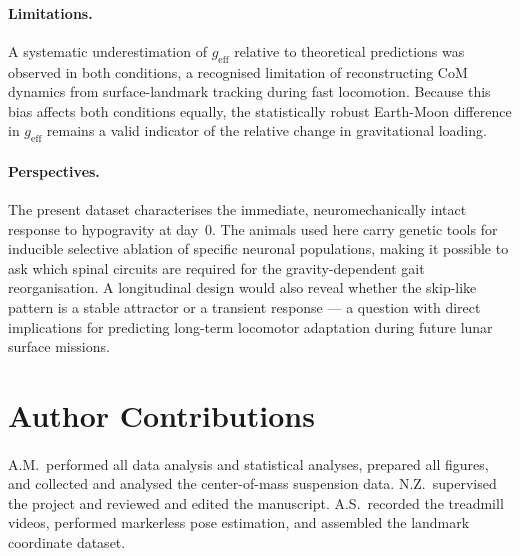 \documentclass[blue]{enslyonstage}
\begin{document}
\paragraph{Limitations.}
A systematic underestimation of $g_\text{eff}$ relative to theoretical
predictions was observed in both conditions, a recognised limitation of
reconstructing CoM dynamics from surface-landmark tracking during fast
locomotion\cite{paveiEstimationAccuracy3D2017}. Because this bias affects
both conditions equally, the statistically robust Earth-Moon difference in
$g_\text{eff}$ remains a valid indicator of the relative change in
gravitational loading.

\paragraph{Perspectives.}
The present dataset characterises the immediate, neuromechanically intact
response to hypogravity at day~0. The animals used here carry genetic tools for
inducible selective ablation of specific neuronal populations, making it
possible to ask which spinal circuits are required for the gravity-dependent
gait reorganisation\cite{santuzWalkingMoonHypogravity2026}. A longitudinal
design would also reveal whether the skip-like pattern is a stable attractor
or a transient response --- a question with direct implications for predicting
long-term locomotor adaptation during future lunar surface missions.

\section*{Author Contributions}
%

\paragraph{}
A.M.\ performed all data analysis and statistical analyses, prepared all
figures, and collected and analysed the center-of-mass suspension data.
N.Z.\ supervised the project and reviewed and edited the manuscript.
A.S.\ recorded the treadmill videos, performed markerless pose estimation, and
assembled the landmark coordinate
dataset\cite{santuzWalkingMoonHypogravity2026}.
\end{document}
